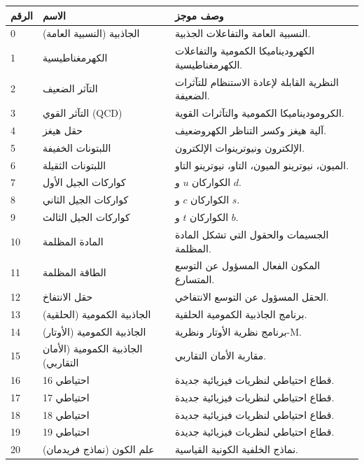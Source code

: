 \documentclass[13pt,a4paper]{article}
\begin{document}
	\begin{longtable}{|p{0.9cm}|p{6.0cm}|p{8.6cm}|}
		\hline
		\textbf{الرقم} & \textbf{الاسم} & \textbf{وصف موجز} \\
		\hline
		\endhead
		0 & الجاذبية (النسبية العامة) & النسبية العامة والتفاعلات الجذبية. \\
		\hline
		1 & الكهرمغناطيسية & الكهروديناميكا الكمومية والتفاعلات الكهرمغناطيسية. \\
		\hline
		2 & التآثر الضعيف & النظرية القابلة لإعادة الاستنظام للتآثرات الضعيفة. \\
		\hline
		3 & التآثر القوي (QCD) & الكروموديناميكا الكمومية والتآثرات القوية. \\
		\hline
		4 & حقل هيغز & آلية هيغز وكسر التناظر الكهروضعيف. \\
		\hline
		5 & اللبتونات الخفيفة & الإلكترون ونيوترينوات الإلكترون. \\
		\hline
		6 & اللبتونات الثقيلة & الميون، نيوترينو الميون، التاو، نيوترينو التاو. \\
		\hline
		7 & كواركات الجيل الأول & الكواركان $u$ و $d$. \\
		\hline
		8 & كواركات الجيل الثاني & الكواركان $c$ و $s$. \\
		\hline
		9 & كواركات الجيل الثالث & الكواركان $t$ و $b$. \\
		\hline
		10 & المادة المظلمة & الجسيمات والحقول التي تشكل المادة المظلمة. \\
		\hline
		11 & الطاقة المظلمة & المكون الفعال المسؤول عن التوسع المتسارع. \\
		\hline
		12 & حقل الانتفاخ & الحقل المسؤول عن التوسع الانتفاخي. \\
		\hline
		13 & الجاذبية الكمومية (الحلقية) & برنامج الجاذبية الكمومية الحلقية. \\
		\hline
		14 & الجاذبية الكمومية (الأوتار) & برنامج نظرية الأوتار ونظرية-M. \\
		\hline
		15 & الجاذبية الكمومية (الأمان التقاربي) & مقاربة الأمان التقاربي. \\
		\hline
		16 & احتياطي 16 & قطاع احتياطي لنظريات فيزيائية جديدة. \\
		\hline
		17 & احتياطي 17 & قطاع احتياطي لنظريات فيزيائية جديدة. \\
		\hline
		18 & احتياطي 18 & قطاع احتياطي لنظريات فيزيائية جديدة. \\
		\hline
		19 & احتياطي 19 & قطاع احتياطي لنظريات فيزيائية جديدة. \\
		\hline
		20 & علم الكون (نماذج فريدمان) & نماذج الخلفية الكونية القياسية. \\

\end{longtable}
\end{document}
